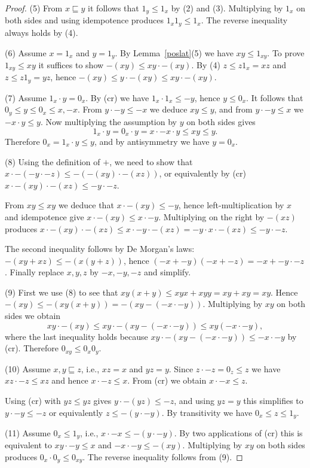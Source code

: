 \documentclass[12pt]{amsart}
\begin{document}
\begin{proof}
(5) From $x\sqsubseteq y$ it follows that $1_y\le 1_x$ by (2) and (3). Multiplying by $1_x$ on both sides and using idempotence produces $1_x1_y\le 1_x$. The reverse inequality always holds by (4).

(6) Assume $x=1_x$ and $y=1_y$. By Lemma~\ref{poslat}(5) we have $xy\le 1_{xy}$. To prove
$1_{xy}\le xy$ it suffices to show $-(xy)\le xy\cdot -(xy)$. By (4) $z\le z1_x=xz$ and $z\le z1_y=yz$,
hence $-(xy)\le y\cdot -(xy)\le xy\cdot -(xy)$.

(7) Assume $1_x\cdot y=0_x$. By (cr) we have $1_x\cdot 1_x\le -y$, hence $y\le 0_x$.
It follows that $0_y\le y\le 0_x\le x,-x$. From $y\cdot -y\le -x$ we deduce $xy\le y$, and from
$y\cdot -y\le x$ we $-x\cdot y\le y$. Now multiplying the assumption by $y$ on both sides
gives
$$
1_x\cdot y=0_x\cdot y=x\cdot -x\cdot y\le  xy\le y.
$$
Therefore $0_x=1_x\cdot y\le y$, and by antisymmetry we have $y=0_x$.

(8) Using the definition of $+$, we need to show that $x\cdot -(-y\cdot -z)\le -(-(xy)\cdot -(xz))$,
or equivalently by (cr) $x\cdot-(xy)\cdot-(xz)\le-y\cdot-z$.

From $xy\le xy$ we deduce that $x\cdot-(xy) \le -y$, hence left-multiplication by $x$
and idempotence give $x\cdot-(xy) \le x\cdot -y$. Multiplying on the right by $-(xz)$ produces
$x\cdot-(xy)\cdot -(xz)\le x\cdot -y\cdot -(xz)=-y\cdot x\cdot -(xz)\le -y\cdot -z$.

The second inequality follows by De Morgan's laws: $-(xy+xz)\le -(x(y+z))$, hence
$(-x+-y)(-x+-z)=-x+-y\cdot -z$. Finally replace $x,y,z$ by $-x,-y,-z$ and simplify.

(9) First we use (8) to see that $xy(x+y)\le xyx+xyy = xy+xy = xy$. Hence $-(xy)\le -(xy(x+y))=
-(xy-(-x\cdot -y))$. Multiplying by $xy$ on both sides we obtain
$$
xy\cdot -(xy)\le xy\cdot -(xy-(-x\cdot -y))\le xy(-x\cdot -y),
$$
where the last inequality holds because $xy\cdot-(xy-(-x\cdot -y))\le -x\cdot -y$ by (cr).
Therefore $0_{xy}\le 0_x0_y$.

(10) Assume $x,y\sqsubseteq z$, i.e., $xz=x$ and $yz=y$. Since $z\cdot -z=0_z\le z$ we have
$xz\cdot -z\le xz$ and hence $x\cdot -z\le x$. From (cr) we obtain $x\cdot -x\le z$.

Using (cr) with $yz\le yz$ gives $y\cdot -(yz)\le -z$, and using $yz=y$ this simplifies to $y\cdot -y\le -z$ or equivalently $z\le -(y\cdot -y)$. By transitivity we have $0_x\le z\le 1_y$.

(11) Assume $0_x\le 1_y$, i.e., $x\cdot -x\le -(y\cdot -y)$. By two applications of (cr) this is equivalent to $xy\cdot -y\le x$ and $-x\cdot -y\le -(xy)$. Multiplying by $xy$ on both sides produces $0_x\cdot 0_y\le 0_{xy}$. The reverse inequality follows from (9).
\end{proof}
\end{document}
